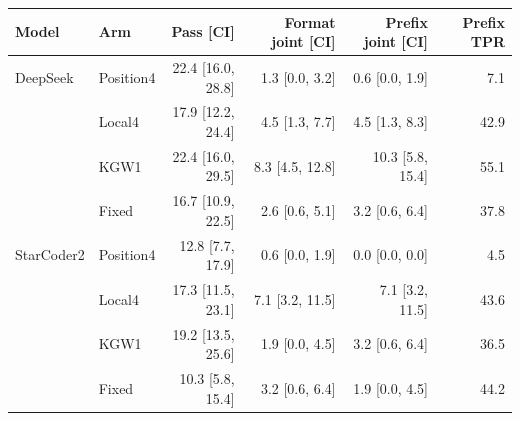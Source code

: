\begin{tabular}{llrrrr}
\toprule
Model & Arm & Pass [CI] & Format joint [CI] & Prefix joint [CI] & Prefix TPR \\
\midrule
DeepSeek & Position4 & 22.4 [16.0, 28.8] & 1.3 [0.0, 3.2] & 0.6 [0.0, 1.9] & 7.1 \\
 & Local4 & 17.9 [12.2, 24.4] & 4.5 [1.3, 7.7] & 4.5 [1.3, 8.3] & 42.9 \\
 & KGW1 & 22.4 [16.0, 29.5] & 8.3 [4.5, 12.8] & 10.3 [5.8, 15.4] & 55.1 \\
 & Fixed & 16.7 [10.9, 22.5] & 2.6 [0.6, 5.1] & 3.2 [0.6, 6.4] & 37.8 \\
StarCoder2 & Position4 & 12.8 [7.7, 17.9] & 0.6 [0.0, 1.9] & 0.0 [0.0, 0.0] & 4.5 \\
 & Local4 & 17.3 [11.5, 23.1] & 7.1 [3.2, 11.5] & 7.1 [3.2, 11.5] & 43.6 \\
 & KGW1 & 19.2 [13.5, 25.6] & 1.9 [0.0, 4.5] & 3.2 [0.6, 6.4] & 36.5 \\
 & Fixed & 10.3 [5.8, 15.4] & 3.2 [0.6, 6.4] & 1.9 [0.0, 4.5] & 44.2 \\
\bottomrule
\end{tabular}
